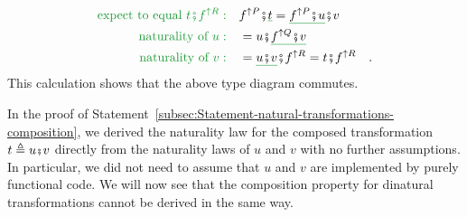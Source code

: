 ~\vspace{-1.8\baselineskip}

\begin{align*}
{\color{greenunder}\text{expect to equal }t\bef f^{\uparrow R}:}\quad & f^{\uparrow P}\bef\gunderline t=\gunderline{f^{\uparrow P}\bef u}\bef v\\
{\color{greenunder}\text{naturality of }u:}\quad & =u\bef\gunderline{f^{\uparrow Q}\bef v}\\
{\color{greenunder}\text{naturality of }v:}\quad & =\gunderline{u\bef v}\bef f^{\uparrow R}=t\bef f^{\uparrow R}\quad.
\end{align*}
This calculation shows that the above type diagram commutes.

In the proof of Statement~\ref{subsec:Statement-natural-transformations-composition},
we derived the naturality law for the composed transformation $t\triangleq u\bef v$
directly from the naturality laws of $u$ and $v$ with no further
assumptions. In particular, we did not need to assume that $u$ and
$v$ are implemented by purely functional code. We will now see that
the composition property for dinatural transformations cannot be derived
in the same way. 

